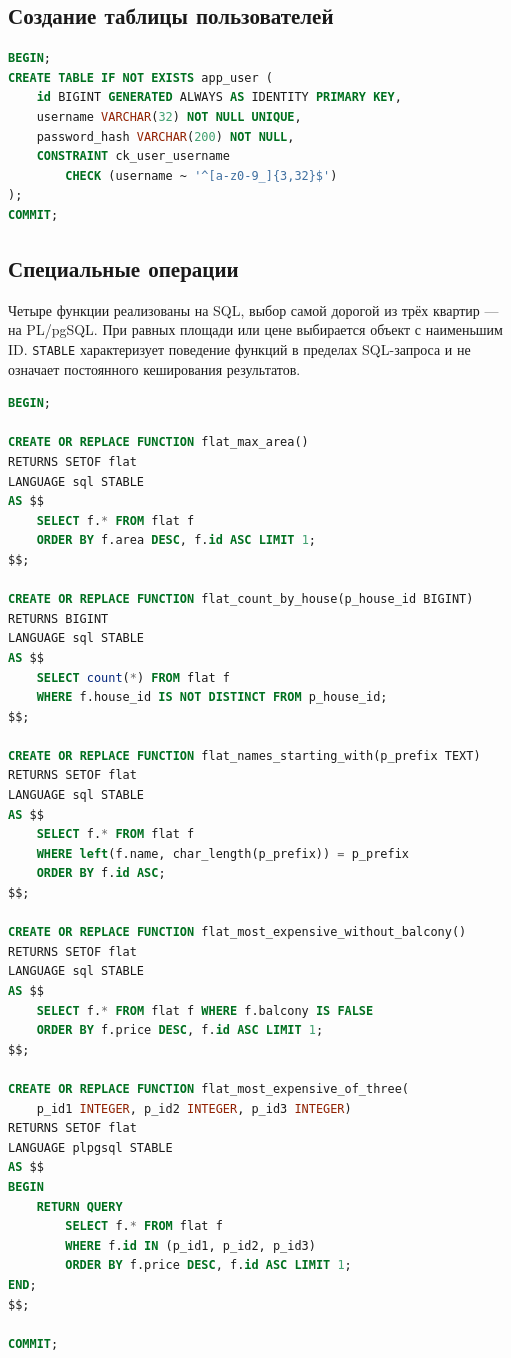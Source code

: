 \documentclass[12pt,a4paper]{article}
\begin{document}
\subsection{Создание таблицы пользователей}
\begin{lstlisting}[language=SQL]
BEGIN;
CREATE TABLE IF NOT EXISTS app_user (
    id BIGINT GENERATED ALWAYS AS IDENTITY PRIMARY KEY,
    username VARCHAR(32) NOT NULL UNIQUE,
    password_hash VARCHAR(200) NOT NULL,
    CONSTRAINT ck_user_username
        CHECK (username ~ '^[a-z0-9_]{3,32}$')
);
COMMIT;
\end{lstlisting}

\subsection{Специальные операции}

Четыре функции реализованы на SQL, выбор самой дорогой из трёх квартир ---
на PL/pgSQL. При равных площади или цене выбирается объект с наименьшим ID.
\texttt{STABLE} характеризует поведение функций в пределах SQL-запроса
и не означает постоянного кеширования результатов.

\begin{lstlisting}[language=SQL]
BEGIN;

CREATE OR REPLACE FUNCTION flat_max_area()
RETURNS SETOF flat
LANGUAGE sql STABLE
AS $$
    SELECT f.* FROM flat f
    ORDER BY f.area DESC, f.id ASC LIMIT 1;
$$;

CREATE OR REPLACE FUNCTION flat_count_by_house(p_house_id BIGINT)
RETURNS BIGINT
LANGUAGE sql STABLE
AS $$
    SELECT count(*) FROM flat f
    WHERE f.house_id IS NOT DISTINCT FROM p_house_id;
$$;

CREATE OR REPLACE FUNCTION flat_names_starting_with(p_prefix TEXT)
RETURNS SETOF flat
LANGUAGE sql STABLE
AS $$
    SELECT f.* FROM flat f
    WHERE left(f.name, char_length(p_prefix)) = p_prefix
    ORDER BY f.id ASC;
$$;

CREATE OR REPLACE FUNCTION flat_most_expensive_without_balcony()
RETURNS SETOF flat
LANGUAGE sql STABLE
AS $$
    SELECT f.* FROM flat f WHERE f.balcony IS FALSE
    ORDER BY f.price DESC, f.id ASC LIMIT 1;
$$;

CREATE OR REPLACE FUNCTION flat_most_expensive_of_three(
    p_id1 INTEGER, p_id2 INTEGER, p_id3 INTEGER)
RETURNS SETOF flat
LANGUAGE plpgsql STABLE
AS $$
BEGIN
    RETURN QUERY
        SELECT f.* FROM flat f
        WHERE f.id IN (p_id1, p_id2, p_id3)
        ORDER BY f.price DESC, f.id ASC LIMIT 1;
END;
$$;

COMMIT;
\end{lstlisting}
\end{document}
